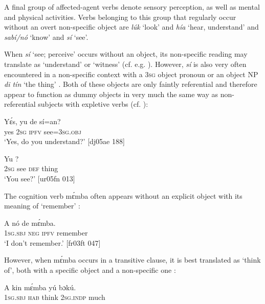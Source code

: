 A final group of affected-agent verbs denote sensory perception, as well as mental and physical activities. Verbs belonging to this group that regularly occur without an overt non-specific object are \textit{lúk} ‘look’ and \textit{hía} ‘hear, understand’ and \textit{sabí}\textit{\textup{/}}\textit{nó} ‘know’ and \textit{sí} ‘see’. 


When \textit{sí} ‘see; perceive’ occurs without an object, its non-specific reading may translate as ‘understand’ or ‘witness’ (cf. e.g. ). However, \textit{sí} is also very often encountered in a non-specific context with a \textsc{3sg} object pronoun  or an object \textsc{NP} \textit{di tín} ‘the thing’ . Both of these objects are only faintly referential and therefore appear to function as dummy objects in very much the same way as non-referential subjects with expletive verbs (cf. ):



\ea%
    \label{ex:key:1290}
    \gll Yɛ́s,  yu  de  sí=an?\\
yes  \textsc{2sg}  \textsc{ipfv}  see=\textsc{3sg.obj}\\

\glt ‘Yes, do you understand?’ [dj05ae 188]
\z


\ea%
    \label{ex:key:1291}
    \gll Yu      ?\\
\textsc{2sg}  see  \textsc{def}  thing\\

\glt ‘You see?’ [ur05fn 013]
\z

The cognition verb mɛ́mba often appears without an explicit object with its meaning of ‘remember’ :


\ea%
    \label{ex:key:1292}
    \gll A    nó  de  mɛ́mba.\\
\textsc{1sg.sbj}  \textsc{neg}  \textsc{ipfv}  remember\\

\glt ‘I don’t remember.’ [fr03ft 047]
\z

However, when mɛ́mba occurs in a transitive clause, it is best translated as ‘think of’, both with a specific object  and a non-specific one : 


\ea%
    \label{ex:key:1293}
    \gll A    kin  mɛ́mba  yú    bɔkú.\\
\textsc{1sg.sbj}  \textsc{hab}  think  \textsc{2sg.indp}  much\\

